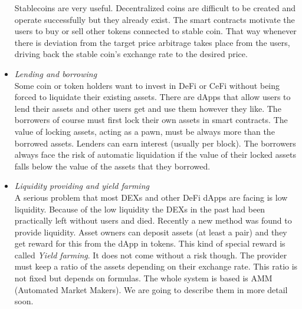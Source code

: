 \documentclass{article}
\begin{document}
\begin{itemize}
Stablecoins are very useful. Decentralized coins are difficult to be created and operate successfully but they already exist. The smart contracts motivate the users to buy or sell other tokens connected to stable coin. That way whenever there is deviation from the target price arbitrage takes place from the users, driving back the stable coin's exchange rate to the desired price.
\item \emph{Lending and borrowing}\\
Some coin or token holders want to invest in DeFi or CeFi without being forced to liquidate their existing assets. There are dApps that allow users to lend their assets and other users get and use them however they like. The borrowers of course must first lock their own assets in smart contracts. The value of locking assets, acting as a pawn, must be always more than the borrowed assets. Lenders can earn interest (usually per block). The borrowers always face the risk of automatic liquidation if the value of their locked assets falls below the value of the assets that they borrowed.
\item \emph{Liquidity providing and yield farming}\\
A serious problem that most DEXs and other DeFi dApps are facing is low liquidity. Because of the low liquidity the DEXs in the past had been practically left without users and died. Recently a new method was found to provide liquidity. Asset owners can deposit assets (at least a pair) and they get reward for this from the dApp in tokens. This kind of special reward is called \emph{Yield farming}. It does not come without a risk though. The provider must keep a ratio of the assets depending on their exchange rate. This ratio is not fixed but depends on formulas. The whole system is based is AMM (Automated Market Makers). We are going to describe them in more detail soon.
\end{itemize}
\end{document}
